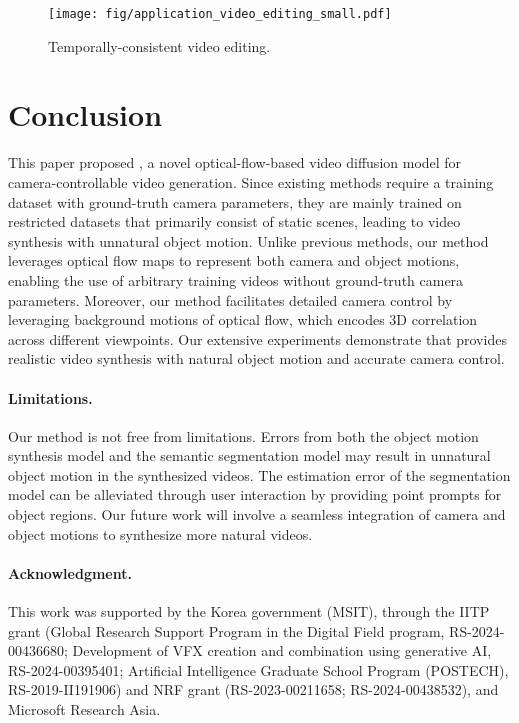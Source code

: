 



\begin{figure}[!t]
\centering
\texttt{[image: fig/application\_video\_editing\_small.pdf]}
\vspace{-3mm}
\caption{
Temporally-consistent video editing.
}
\label{fig:video_editing}
\vspace{-1mm}
\end{figure}



\section{Conclusion}
\label{sec:conclusion}
This paper proposed \MethodName{}, a novel optical-flow-based video diffusion model for camera-controllable video generation.
Since existing methods require a training dataset with ground-truth camera parameters, they are mainly trained on restricted datasets that primarily consist of static scenes, leading to video synthesis with unnatural object motion.
Unlike previous methods, our method leverages optical flow maps to represent both camera and object motions, enabling the use of arbitrary training videos without ground-truth camera parameters.
Moreover, our method facilitates detailed camera control by leveraging background motions of optical flow, which encodes 3D correlation across different viewpoints.
Our extensive experiments demonstrate that \MethodName{} provides realistic video synthesis with natural object motion and accurate camera control.


\vspace{-4mm}
\paragraph{Limitations.}
Our method is not free from limitations.
Errors from both the object motion synthesis model and the semantic segmentation model may result in unnatural object motion in the synthesized videos.
The estimation error of the segmentation model can be alleviated through user interaction by providing point prompts for object regions.
Our future work will involve a seamless integration of camera and object motions to synthesize more natural videos.

\vspace{-3.5mm}
\paragraph{Acknowledgment.}
This work was supported by the Korea government (MSIT), through the IITP grant (Global Research Support Program in the Digital Field program, RS-2024-00436680; Development of VFX creation and combination using generative AI, RS-2024-00395401; Artificial Intelligence Graduate School Program (POSTECH), RS-2019-II191906) and NRF grant (RS-2023-00211658; RS-2024-00438532), and Microsoft Research Asia.


